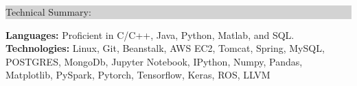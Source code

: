 \documentclass{article} %
\newcommand{\rsection}[1]{
\hspace{-0.4cm}
\colorbox{lightgrey}{
\begin{minipage}{1.07\linewidth}
\vspace{0.25cm}
\fontsize{14pt}{16pt}\selectfont #1 
\vspace{0.15cm}
\end{minipage}
}
\vspace*{-0.2cm}
}
\newcommand{\rjob}[2]{
\vspace{0.1cm}
\hspace*{-0.3cm}  
{\fontsize{10pt}{12pt}\selectfont #1} \hfill #2 
\vspace*{0.1cm} 
\hspace*{-1.2cm}
}
\newenvironment{ritemize}{
\hspace*{-0.8cm} 
\begin{minipage}{1.05\linewidth}
\begin{itemize}
}{
\end{itemize}
\end{minipage}
\vspace{-0.2cm}
}
\newcommand{\ritem}{
\item[-]
}
\begin{document}




\rsection{Technical Summary:}

\hspace*{-0.3cm}
\textbf{Languages:} Proficient in C/C++, Java, Python, Matlab, and SQL. \\
\hspace*{-0.3cm}
\textbf{Technologies:} Linux, Git, Beanstalk, AWS EC2, Tomcat, Spring, MySQL, POSTGRES, MongoDb, Jupyter Notebook, IPython, Numpy, Pandas, Matplotlib, PySpark, Pytorch, Tensorflow, Keras, ROS, LLVM
\end{document}
